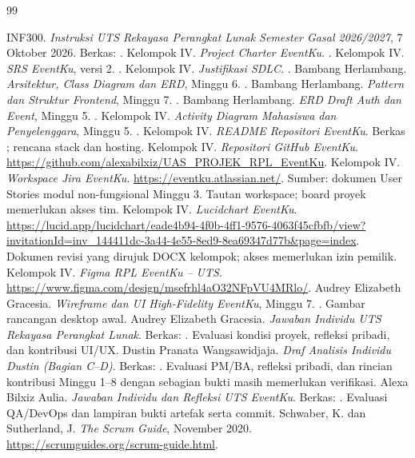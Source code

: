 \documentclass[11pt,a4paper]{article}
\begin{document}
\clearpage\begin{thebibliography}{99}
 INF300. \emph{Instruksi UTS Rekayasa Perangkat Lunak Semester Gasal 2026/2027}, 7 Oktober 2026. Berkas: .
 Kelompok IV. \emph{Project Charter EventKu}. .
 Kelompok IV. \emph{SRS EventKu}, versi 2. .
 Kelompok IV. \emph{Justifikasi SDLC}. .
 Bambang Herlambang. \emph{Arsitektur, Class Diagram dan ERD}, Minggu 6. .
 Bambang Herlambang. \emph{Pattern dan Struktur Frontend}, Minggu 7. .
 Bambang Herlambang. \emph{ERD Draft Auth dan Event}, Minggu 5. .
 Kelompok IV. \emph{Activity Diagram Mahasiswa dan Penyelenggara}, Minggu 5. .
 Kelompok IV. \emph{README Repositori EventKu}. Berkas ; rencana stack dan hosting.
 Kelompok IV. \emph{Repositori GitHub EventKu}. \url{https://github.com/alexabilxiz/UAS_PROJEK_RPL_EventKu}.
 Kelompok IV. \emph{Workspace Jira EventKu}. \url{https://eventku.atlassian.net/}. Sumber: dokumen User Stories modul non-fungsional Minggu 3. Tautan workspace; board proyek memerlukan akses tim.
 Kelompok IV. \emph{Lucidchart EventKu}. \url{https://lucid.app/lucidchart/eade4b94-4f0b-4ff1-9576-4063f45cfbfb/view?invitationId=inv_144411dc-3a44-4e55-8ed9-8ea69347d77b&page=index}. Dokumen revisi yang dirujuk DOCX kelompok; akses memerlukan izin pemilik.
 Kelompok IV. \emph{Figma RPL EventKu -- UTS}. \url{https://www.figma.com/design/msefrhl4aO32NFpVU4MRlo/}.
 Audrey Elizabeth Gracesia. \emph{Wireframe dan UI High-Fidelity EventKu}, Minggu 7. . Gambar rancangan desktop awal.
 Audrey Elizabeth Gracesia. \emph{Jawaban Individu UTS Rekayasa Perangkat Lunak}. Berkas: . Evaluasi kondisi proyek, refleksi pribadi, dan kontribusi UI/UX.
 Dustin Pranata Wangsawidjaja. \emph{Draf Analisis Individu Dustin (Bagian C--D)}. Berkas: . Evaluasi PM/BA, refleksi pribadi, dan rincian kontribusi Minggu 1--8 dengan sebagian bukti masih memerlukan verifikasi.
 Alexa Bilxiz Aulia. \emph{Jawaban Individu dan Refleksi UTS EventKu}. Berkas: . Evaluasi QA/DevOps dan lampiran bukti artefak serta commit.
 Schwaber, K. dan Sutherland, J. \emph{The Scrum Guide}, November 2020. \url{https://scrumguides.org/scrum-guide.html}.
\end{thebibliography}
\end{document}
